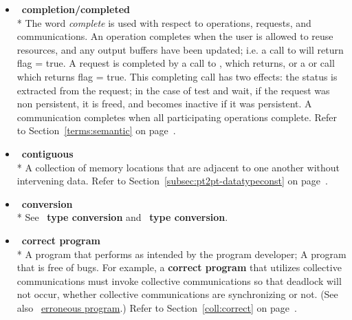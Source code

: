 \begin{itemize}
\label{glossary:completion_completed}
\item  ~\hypertarget{glossary:completion_completed}{\textbf{completion/completed}} \\*
The word \emph{complete} is used with respect to operations, requests, and communications. 
An operation completes when the user is allowed to reuse resources, and any output 
buffers have been updated; i.e. a call to  will return flag = true. A request is 
completed by a call to , which returns, or a  or  
call which returns flag = true. 
This completing call has two effects: the status is extracted from the request; in the case 
of test and wait, if the request was non persistent, it is freed, and becomes inactive if it 
was persistent. A communication completes when all participating operations complete.
Refer to Section~\ref{terms:semantic} on page~\pageref{terms:semantic}.

\label{glossary:contiguous}
\item  ~\hypertarget{glossary:contiguous}{\textbf{contiguous}} \\*
A collection of memory locations that are adjacent to one another
without intervening data.
Refer to Section~\ref{subsec:pt2pt-datatypeconst} on page~\pageref{subsec:pt2pt-datatypeconst}.

\label{glossary:conversion}
\item  ~\hypertarget{glossary:conversion}{\textbf{conversion}} \\*
See ~\hypertarget{glossary:type_conversion}{\textbf{type conversion}} and ~\hypertarget{glossary:representation_conversion}{\textbf{type conversion}}.

\label{glossary:correct_program}
\item  ~\hypertarget{glossary:correct_program}{\textbf{correct program}} \\*
A program that performs as intended by the program developer; A program that is free of bugs. 
For example, a  {\bf correct program} that utilizes collective communications
must invoke collective communications so
that deadlock will
not occur, whether collective communications are synchronizing or not.
(See also ~\hyperlink{glossary:erroneous_program}{erroneous program}.)
Refer to Section~\ref{coll:correct} on page~\pageref{coll:correct}.


\end{itemize}
